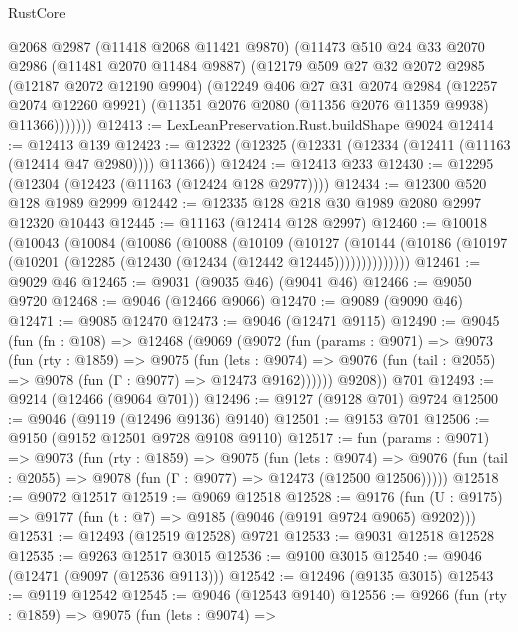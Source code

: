 \begin{lexlean}{RustCore}
\begin{coremodule}
          @2068
          @2987
          (@11418 @2068 @11421 @9870)
          (@11473
            @510
            @24
            @33
            @2070
            @2986
            (@11481 @2070 @11484 @9887)
            (@12179
              @509
              @27
              @32
              @2072
              @2985
              (@12187 @2072 @12190 @9904)
              (@12249
                @406
                @27
                @31
                @2074
                @2984
                (@12257 @2074 @12260 @9921)
                (@11351 @2076 @2080 (@11356 @2076 @11359 @9938) @11366)))))))
@12413 := LexLeanPreservation.Rust.buildShape @9024
@12414 := @12413 @139
@12423 := @12322 (@12325 (@12331 (@12334 (@12411 (@11163 (@12414 @47 @2980)))) @11366))
@12424 := @12413 @233
@12430 := @12295 (@12304 (@12423 (@11163 (@12424 @128 @2977))))
@12434 := @12300 @520 @128 @1989 @2999
@12442 := @12335 @128 @218 @30 @1989 @2080 @2997 @12320 @10443
@12445 := @11163 (@12414 @128 @2997)
@12460 := @10018
    (@10043
      (@10084
        (@10086
          (@10088
            (@10109
              (@10127
                (@10144 (@10186 (@10197 (@10201 (@12285 (@12430 (@12434 (@12442 @12445))))))))))))))
@12461 := @9029 @46
@12465 := @9031 (@9035 @46) (@9041 @46)
@12466 := @9050 @9720
@12468 := @9046 (@12466 @9066)
@12470 := @9089 (@9090 @46)
@12471 := @9085 @12470
@12473 := @9046 (@12471 @9115)
@12490 := @9045
    (fun (fn : @108) =>
    @12468
      (@9069
        (@9072
          (fun (params : @9071) =>
          @9073
            (fun (rty : @1859) =>
            @9075
              (fun (lets : @9074) =>
              @9076 (fun (tail : @2055) => @9078 (fun (Γ : @9077) => @12473 @9162))))))
        @9208))
    @701
@12493 := @9214 (@12466 (@9064 @701))
@12496 := @9127 (@9128 @701) @9724
@12500 := @9046 (@9119 (@12496 @9136) @9140)
@12501 := @9153 @701
@12506 := @9150 (@9152 @12501 @9728 @9108 @9110)
@12517 := fun (params : @9071) =>
  @9073
    (fun (rty : @1859) =>
    @9075
      (fun (lets : @9074) =>
      @9076 (fun (tail : @2055) => @9078 (fun (Γ : @9077) => @12473 (@12500 @12506)))))
@12518 := @9072 @12517
@12519 := @9069 @12518
@12528 := @9176 (fun (U : @9175) => @9177 (fun (t : @7) => @9185 (@9046 (@9191 @9724 @9065) @9202)))
@12531 := @12493 (@12519 @12528) @9721
@12533 := @9031 @12518 @12528
@12535 := @9263 @12517 @3015
@12536 := @9100 @3015
@12540 := @9046 (@12471 (@9097 (@12536 @9113)))
@12542 := @12496 (@9135 @3015)
@12543 := @9119 @12542
@12545 := @9046 (@12543 @9140)
@12556 := @9266
    (fun (rty : @1859) =>
    @9075
      (fun (lets : @9074) =>

\end{coremodule}
\end{lexlean}
